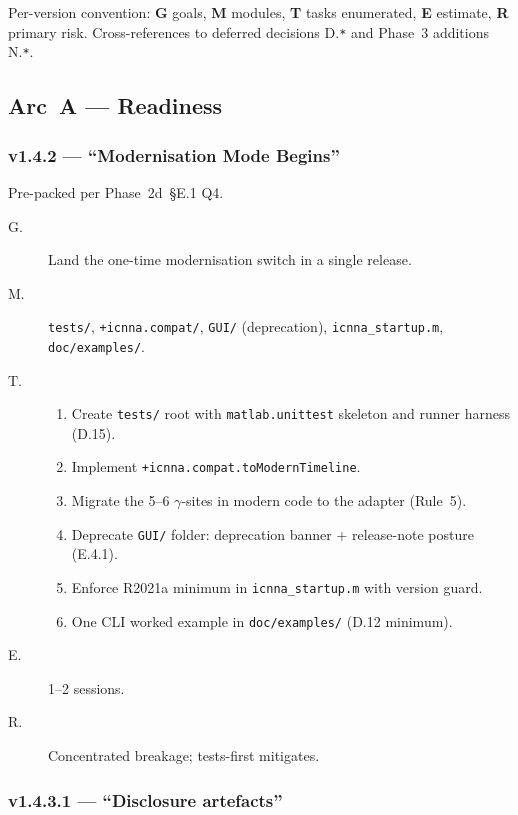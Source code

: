 \documentclass[11pt,a4paper]{article}
\begin{document}
Per-version convention: \textbf{G} goals, \textbf{M} modules, \textbf{T} tasks enumerated, \textbf{E} estimate, \textbf{R} primary risk. Cross-references to deferred decisions D.\texttt{*} and Phase~3 additions N.\texttt{*}.

\subsection{Arc~A --- Readiness}

\subsubsection*{v1.4.2 --- ``Modernisation Mode Begins''}

Pre-packed per Phase~2d~\S E.1 Q4.

\begin{description}
    \item[G.] Land the one-time modernisation switch in a single release.
    \item[M.] \texttt{tests/}, \texttt{+icnna.compat/}, \texttt{GUI/} (deprecation), \texttt{icnna\_startup.m}, \texttt{doc/examples/}.
    \item[T.]
        \begin{enumerate}[nosep]
            \item Create \texttt{tests/} root with \texttt{matlab.unittest} skeleton and runner harness (D.15).
            \item Implement \texttt{+icnna.compat.toModernTimeline}.
            \item Migrate the 5--6 $\gamma$-sites in modern code to the adapter (Rule~5).
            \item Deprecate \texttt{GUI/} folder: deprecation banner + release-note posture (E.4.1).
            \item Enforce R2021a minimum in \texttt{icnna\_startup.m} with version guard.
            \item One CLI worked example in \texttt{doc/examples/} (D.12 minimum).
        \end{enumerate}
    \item[E.] 1--2 sessions.
    \item[R.] Concentrated breakage; tests-first mitigates.
\end{description}

\subsubsection*{v1.4.3.1 --- ``Disclosure artefacts''}
\end{document}
